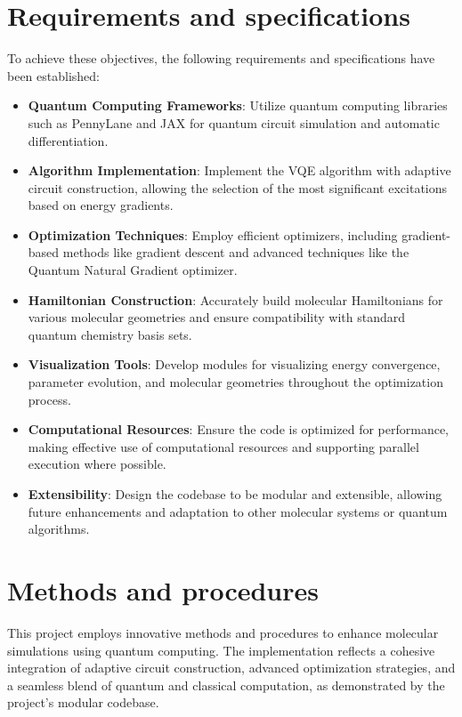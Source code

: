 \section{Requirements and specifications}

To achieve these objectives, the following requirements and specifications have been established:

\begin{itemize} 
  \item \textbf{Quantum Computing Frameworks}: Utilize quantum computing libraries such as PennyLane and JAX for quantum circuit simulation and automatic differentiation. 
  \item \textbf{Algorithm Implementation}: Implement the VQE algorithm with adaptive circuit construction, allowing the selection of the most significant excitations based on energy gradients. 
  \item \textbf{Optimization Techniques}: Employ efficient optimizers, including gradient-based methods like gradient descent and advanced techniques like the Quantum Natural Gradient optimizer. 
  \item \textbf{Hamiltonian Construction}: Accurately build molecular Hamiltonians for various molecular geometries and ensure compatibility with standard quantum chemistry basis sets. 
  \item \textbf{Visualization Tools}: Develop modules for visualizing energy convergence, parameter evolution, and molecular geometries throughout the optimization process. 
  \item \textbf{Computational Resources}: Ensure the code is optimized for performance, making effective use of computational resources and supporting parallel execution where possible. 
  \item \textbf{Extensibility}: Design the codebase to be modular and extensible, allowing future enhancements and adaptation to other molecular systems or quantum algorithms. 
\end{itemize}

\section{Methods and procedures}

This project employs innovative methods and procedures to enhance molecular simulations using quantum computing. The implementation reflects a cohesive integration of adaptive circuit construction, advanced optimization strategies, and a seamless blend of quantum and classical computation, as demonstrated by the project's modular codebase.

